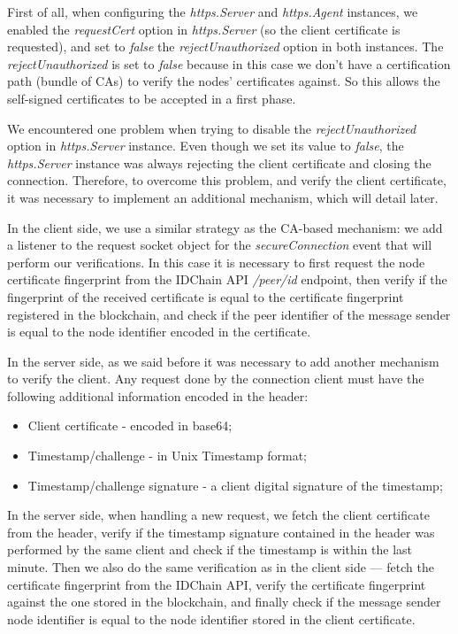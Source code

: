 First of all, when configuring the \textit{https.Server} and \textit{https.Agent} instances, we enabled the \textit{requestCert} option in \textit{https.Server} (so the client certificate is requested), and set to \textit{false} the \textit{rejectUnauthorized} option in both instances.
The \textit{rejectUnauthorized} is set to \textit{false} because in this case we don't have a certification path (bundle of CAs) to verify the nodes' certificates against.
So this allows the self-signed certificates to be accepted in a first phase.

We encountered one problem when trying to disable the \textit{rejectUnauthorized} option in \textit{https.Server} instance.
Even though we set its value to \textit{false}, the \textit{https.Server} instance was always rejecting the client certificate and closing the connection.
Therefore, to overcome this problem, and verify the client certificate, it was necessary to implement an additional mechanism, which will detail later.

In the client side, we use a similar strategy as the CA-based mechanism: we add a listener to the request socket object for the \textit{secureConnection} event that will perform our verifications.
In this case it is necessary to first request the node certificate fingerprint from the IDChain API \textit{/peer/id} endpoint, then verify if the fingerprint of the received certificate is equal to the certificate fingerprint registered in the blockchain, and check if the peer identifier of the message sender is equal to the node identifier encoded in the certificate.

In the server side, as we said before it was necessary to add another mechanism to verify the client.
Any request done by the connection client must have the following additional information encoded in the header:

\begin{itemize}
  \item Client certificate - encoded in base64;
  \item Timestamp/challenge - in Unix Timestamp format;
  \item Timestamp/challenge signature - a client digital signature of the timestamp;
\end{itemize}

In the server side, when handling a new request, we fetch the client certificate from the header, verify if the timestamp signature contained in the header was performed by the same client and check if the timestamp is within the last minute.
Then we also do the same verification as in the client side — fetch the certificate fingerprint from the IDChain API, verify the certificate fingerprint against the one stored in the blockchain, and finally check if the message sender node identifier is equal to the node identifier stored in the client certificate.

